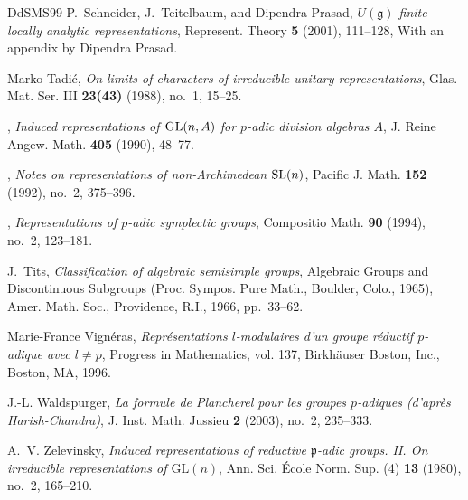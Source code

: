 \documentclass[a4paper]{amsart}
\numberwithin{equation}{section}
\theoremstyle{remark}
\theoremstyle{definition}
\begin{document}
\begin{thebibliography}{DdSMS99}
P.~Schneider, J.~Teitelbaum, and Dipendra Prasad, \emph{{$U({\mathfrak
  g})$}-finite locally analytic representations}, Represent. Theory \textbf{5}
  (2001), 111--128, With an appendix by Dipendra Prasad. 

Marko Tadi\'{c}, \emph{On limits of characters of irreducible unitary
  representations}, Glas. Mat. Ser. III \textbf{23(43)} (1988), no.~1, 15--25.

\bysame, \emph{Induced representations of {${\rm GL}(n,A)$} for {$p$}-adic
  division algebras {$A$}}, J. Reine Angew. Math. \textbf{405} (1990), 48--77.

\bysame, \emph{Notes on representations of non-{A}rchimedean {${\rm SL}(n)$}},
  Pacific J. Math. \textbf{152} (1992), no.~2, 375--396. 

\bysame, \emph{Representations of {$p$}-adic symplectic groups}, Compositio
  Math. \textbf{90} (1994), no.~2, 123--181. 

J.~Tits, \emph{Classification of algebraic semisimple groups}, Algebraic
  {G}roups and {D}iscontinuous {S}ubgroups ({P}roc. {S}ympos. {P}ure {M}ath.,
  {B}oulder, {C}olo., 1965), Amer. Math. Soc., Providence, R.I., 1966,
  pp.~33--62. 

Marie-France Vign\'{e}ras, \emph{Repr\'{e}sentations {$l$}-modulaires d'un
  groupe r\'{e}ductif {$p$}-adique avec {$l\ne p$}}, Progress in Mathematics,
  vol. 137, Birkh\"{a}user Boston, Inc., Boston, MA, 1996. 

J.-L. Waldspurger, \emph{La formule de {P}lancherel pour les groupes
  {$p$}-adiques (d'apr\`es {H}arish-{C}handra)}, J. Inst. Math. Jussieu
  \textbf{2} (2003), no.~2, 235--333. 

A.~V. Zelevinsky, \emph{Induced representations of reductive {${\mathfrak
  p}$}-adic groups. {II}. {O}n irreducible representations of
  {${\mathrm{GL}}(n)$}}, Ann. Sci. \'Ecole Norm. Sup. (4) \textbf{13} (1980),
  no.~2, 165--210. 

\end{thebibliography}
\end{document}
